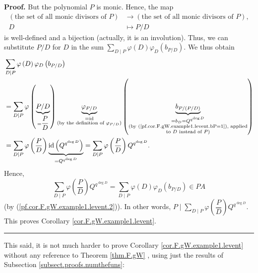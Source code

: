 \documentclass[numbers=enddot,12pt,final,onecolumn,notitlepage]{scrartcl}%
\theoremstyle{definition}
\newenvironment{proof}[1][Proof]{\noindent\textbf{#1.} }{\ \rule{0.5em}{0.5em}}
\let\sumnonlimits\sum
\renewcommand{\sum}{\sumnonlimits\limits}
\begin{document}
\begin{proof}
But the polynomial $P$ is monic. Hence, the map%
\begin{align*}
\left(  \text{the set of all monic divisors of }P\right)   &  \rightarrow
\left(  \text{the set of all monic divisors of }P\right)  ,\\
D &  \mapsto P/D
\end{align*}
is well-defined and a bijection (actually, it is an involution). Thus, we can
substitute $P/D$ for $D$ in the sum $\sum_{D\mid P}\varphi\left(  D\right)
\varphi_{D}\left(  b_{P/D}\right)  $. We thus obtain%
\begin{align*}
&  \sum_{D\mid P}\varphi\left(  D\right)  \varphi_{D}\left(  b_{P/D}\right)
\\
&  =\sum_{D\mid P}\varphi\left(  \underbrace{P/D}_{=\dfrac{P}{D}}\right)
\underbrace{\varphi_{P/D}}_{\substack{=\operatorname*{id}\\\text{(by the
definition of }\varphi_{P/D}\text{)}}}\left(  \underbrace{b_{P/\left(
P/D\right)  }}_{\substack{=b_{D}=Q^{q^{\deg D}}\\\text{(by
(\ref{pf.cor.F.gW.example1.levent.bP=1}), applied}\\\text{to }D\text{ instead
of }P\text{)}}}\right)  \\
&  =\sum_{D\mid P}\varphi\left(  \dfrac{P}{D}\right)
\underbrace{\operatorname*{id}\left(  Q^{q^{\deg D}}\right)  }_{=Q^{q^{\deg
D}}}=\sum_{D\mid P}\varphi\left(  \dfrac{P}{D}\right)  Q^{q^{\deg D}}.
\end{align*}
Hence,%
\[
\sum_{D\mid P}\varphi\left(  \dfrac{P}{D}\right)  Q^{q^{\deg D}}=\sum_{D\mid
P}\varphi\left(  D\right)  \varphi_{D}\left(  b_{P/D}\right)  \in PA
\]
(by (\ref{pf.cor.F.gW.example1.levent.2})). In other words, $P\mid\sum_{D\mid
P}\varphi\left(  \dfrac{P}{D}\right)  Q^{q^{\deg D}}$. This proves Corollary
\ref{cor.F.gW.example1.levent}.
\end{proof}

This said, it is not much harder to prove Corollary
\ref{cor.F.gW.example1.levent} without any reference to Theorem \ref{thm.F.gW}%
, using just the results of Subsection \ref{subsect.proofs.numthefuns}:
\end{document}
